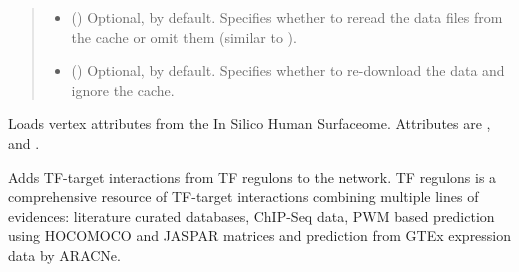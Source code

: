 \documentclass[letterpaper,10pt,english]{sphinxmanual}
\begin{document}
\begin{fulllineitems}
\begin{fulllineitems}
\begin{quote}
\begin{description}
\begin{itemize}
\item {} 
 () \textendash{} Optional,  by default. Specifies whether to reread
the data files from the cache or omit them (similar to
).

\item {} 
 () \textendash{} Optional,  by default. Specifies whether to
re-download the data and ignore the cache.

\end{itemize}

\end{description}\end{quote}

\end{fulllineitems}


\begin{fulllineitems}
\label{\detokenize{reference:pypath.main.PyPath.load_signor_ptms}}
\end{fulllineitems}


\begin{fulllineitems}
\label{\detokenize{reference:pypath.main.PyPath.load_surfaceome_attrs}}
Loads vertex attributes from the In Silico Human Surfaceome.
Attributes are ,  and
.

\end{fulllineitems}


\begin{fulllineitems}
\label{\detokenize{reference:pypath.main.PyPath.load_tfregulons}}
Adds TF-target interactions from TF regulons to the network.
TF regulons is a comprehensive resource of TF-target
interactions combining multiple lines of evidences: literature
curated databases, ChIP-Seq data, PWM based prediction using
HOCOMOCO and JASPAR matrices and prediction from GTEx expression
data by ARACNe.


\end{fulllineitems}
\end{fulllineitems}
\end{document}
